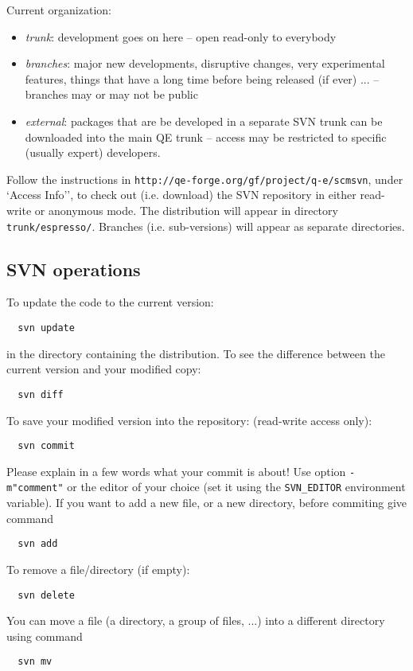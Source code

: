 \documentclass[12pt,a4paper]{article}
\begin{document}
Current organization:
\begin{itemize}
\item {\em trunk}: development goes on here -- open read-only to everybody
\item {\em branches}: major new developments, disruptive changes, very
experimental features, things that have a long time before being released
(if ever) ... -- branches may or may not be public
\item {\em external}: packages that are be developed in a separate SVN trunk
can be downloaded into the main QE trunk -- access may be restricted to
specific (usually expert) developers.
\end{itemize}

Follow the instructions in
\texttt{http://qe-forge.org/gf/project/q-e/scmsvn},
under `Access Info'',
to check out (i.e.  download) the SVN repository in either 
read-write or anonymous mode.
The distribution will appear in directory \texttt{trunk/espresso/}.
Branches (i.e. sub-versions) will appear as separate directories.

\subsection{SVN operations}

To update the code to the current version: 
\begin{verbatim}
  svn update
\end{verbatim}
in the directory containing the distribution.
To see the difference between the current version and your modified 
copy:
\begin{verbatim}
  svn diff
\end{verbatim}
To save your modified version into the repository:
(read-write access only):
\begin{verbatim}
  svn commit
\end{verbatim}
Please explain in a few words what your commit is about! Use option
\texttt{-m"comment"} or the editor of your choice (set it using the
\texttt{SVN\_EDITOR} environment variable).
If you want to add a new file, or a new directory, before commiting 
give command
\begin{verbatim}
  svn add
\end{verbatim}
To remove a file/directory (if empty):
\begin{verbatim}
  svn delete
\end{verbatim}
You can move a file (a directory, a group of files, ...) into a different
directory using command
\begin{verbatim}
  svn mv
\end{verbatim}
\end{document}
